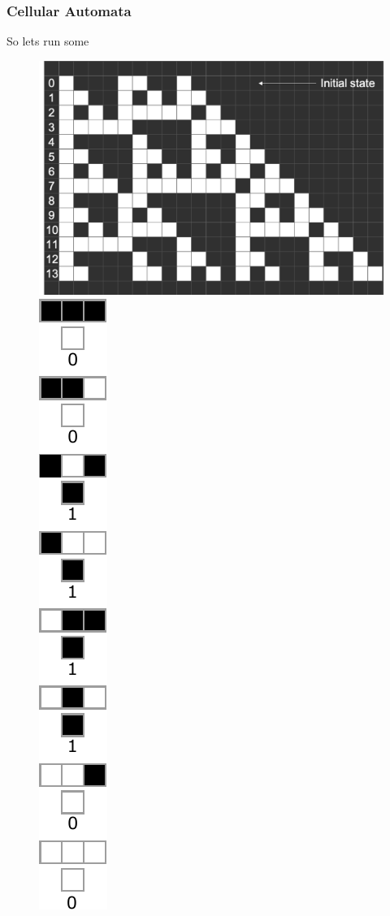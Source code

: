 \documentclass{beamer}
\begin{document}
\begin{frame}
    \centering
    \let\thefootnote\relax{}
\end{frame}

\begin{frame}
    \frametitle{Cellular Automata}
    So lets run some 
    \begin{figure}
        \includegraphics[scale=0.3]{fig3.png}
        \includegraphics[scale=0.5]{rule60.pdf}

\end{figure}
\end{frame}
\end{document}
